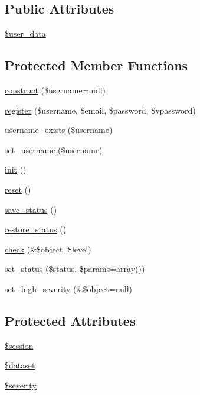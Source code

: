 \subsection*{Public Attributes}
\begin{DoxyCompactItemize}
\item 
\hyperlink{classUserHandler_ae7a2d59eee65560ac96b860e828bb445}{\$user\_\-data}
\end{DoxyCompactItemize}
\subsection*{Protected Member Functions}
\begin{DoxyCompactItemize}
\item 
\hyperlink{classUser_a9cf024c7e3148e45afd1bee7691ceefd}{construct} (\$username=null)
\item 
\hyperlink{classUser_ac262f6dc9d3a121c25045fe6716e014a}{register} (\$username, \$email, \$password, \$vpassword)
\item 
\hyperlink{classUserHandler_a4b50cc703608c490080b25c5b2ae3418}{username\_\-exists} (\$username)
\item 
\hyperlink{classUserHandler_afbcc9a275b547cca0bd4cff567b054a0}{set\_\-username} (\$username)
\item 
\hyperlink{class__OWL_ae0ef3ded56e8a6b34b6461e5a721cd3e}{init} ()
\item 
\hyperlink{class__OWL_a2f2a042bcf31965194c03033df0edc9b}{reset} ()
\item 
\hyperlink{class__OWL_a9e49b9c76fbc021b244c6915ea536d71}{save\_\-status} ()
\item 
\hyperlink{class__OWL_a465eeaf40edd9f9c848841700c32ce55}{restore\_\-status} ()
\item 
\hyperlink{class__OWL_ad6f4f6946f40199dd0333cf219fa500e}{check} (\&\$object, \$level)
\item 
\hyperlink{class__OWL_aea912d0ede9b3c2a69b79072d94d4787}{set\_\-status} (\$status, \$params=array())
\item 
\hyperlink{class__OWL_a576829692a3b66e3d518853bf43abae3}{set\_\-high\_\-severity} (\&\$object=null)
\end{DoxyCompactItemize}
\subsection*{Protected Attributes}
\begin{DoxyCompactItemize}
\item 
\hyperlink{classUserHandler_af097b7fd1ee085b46a6c34e071508a7f}{\$session}
\item 
\hyperlink{classUserHandler_ac38c1ea50b2820ed03781bdbe8eb2e08}{\$dataset}
\item 
\hyperlink{class__OWL_ad26b40a9dbbacb33e299b17826f8327c}{\$severity}
\end{DoxyCompactItemize}


